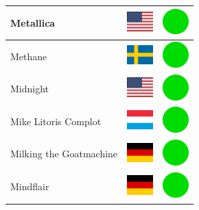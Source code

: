 \documentclass[12pt, a4paper, twoside]{report}
\begin{document}
\begin{center}
\begin{longtable}{|p{5cm}|p{2cm}|p{2cm}|}
 Metallica                                                  & \includegraphics[width=1cm]{../4x3/us} &   \includegraphics[width=1cm]{../likes/y} \\ \hline
 Methane                                                    & \includegraphics[width=1cm]{../4x3/se} &   \includegraphics[width=1cm]{../likes/y} \\ \hline
 Midnight                                                   & \includegraphics[width=1cm]{../4x3/us} &   \includegraphics[width=1cm]{../likes/y} \\ \hline
 Mike Litoris Complot                                       & \includegraphics[width=1cm]{../4x3/lu} &   \includegraphics[width=1cm]{../likes/y} \\ \hline
 Milking the Goatmachine                                    & \includegraphics[width=1cm]{../4x3/de} &   \includegraphics[width=1cm]{../likes/y} \\ \hline
 Mindflair                                                  & \includegraphics[width=1cm]{../4x3/de} &   \includegraphics[width=1cm]{../likes/y} \\ \hline

\end{longtable}
\end{center}
\end{document}
